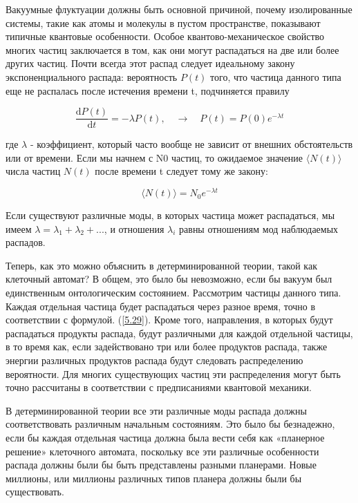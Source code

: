 \documentclass[main.tex]{subfiles}
\begin{document}
Вакуумные флуктуации должны быть основной причиной, почему изолированные системы, такие как атомы и молекулы в пустом пространстве, показывают типичные квантовые особенности. Особое квантово-механическое свойство многих частиц заключается в том, как они могут распадаться на две или более других частиц. Почти всегда этот распад следует идеальному закону экспоненциального распада: вероятность $P(t)$ того, что частица данного типа еще не распалась после истечения времени t, подчиняется правилу

\begin{equation}\label{5.29}
	\frac{\mathrm{d} P(t)}{\mathrm{d} t}=-\lambda P(t), \quad \rightarrow \quad P(t)=P(0) e^{-\lambda t}
\end{equation}
                        
где $\lambda$ - коэффициент, который часто вообще не зависит от внешних обстоятельств или от времени. Если мы начнем с N0 частиц, то ожидаемое значение $\langle N(t) \rangle$ числа частиц $N (t)$ после времени t следует тому же закону:


\begin{equation}\label{5.30}
	\langle N(t) \rangle = N_0 e^{-\lambda t}
\end{equation}

             
Если существуют различные моды, в которых частица может распадаться, мы имеем $\lambda = \lambda_1 + \lambda_2 + ...$, и отношения $\lambda_i$ равны отношениям мод наблюдаемых распадов.

Теперь, как это можно объяснить в детерминированной теории, такой как клеточный автомат? В общем, это было бы невозможно, если бы вакуум был единственным онтологическим состоянием. Рассмотрим частицы данного типа. Каждая отдельная частица будет распадаться через разное время, точно в соответствии с формулой. (\ref{5.29}). Кроме того, направления, в которых будут распадаться продукты распада, будут различными для каждой отдельной частицы, в то время как, если задействовано три или более продуктов распада, также энергии различных продуктов распада будут следовать распределению вероятности. Для многих существующих частиц эти распределения могут быть точно рассчитаны в соответствии с предписаниями квантовой механики.

В детерминированной теории все эти различные моды распада должны соответствовать различным начальным состояниям. Это было бы безнадежно, если бы каждая отдельная частица должна была вести себя как «планерное решение» клеточного автомата, поскольку все эти различные особенности распада должны были бы быть представлены разными планерами. Новые миллионы, или миллионы различных типов планера должны были бы существовать.
\end{document}
